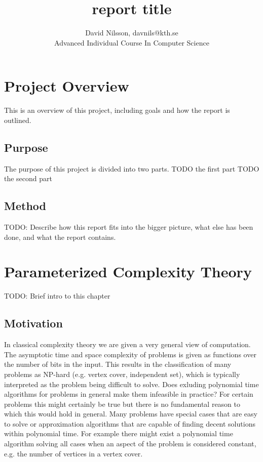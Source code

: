 \documentclass[a4paper,11pt,notitlepage]{report}
\title{report title}
\author{David Nilsson, davnils@kth.se \\ Advanced Individual Course In Computer
Science}
\theoremstyle{plain}
\theoremstyle{definition}
\begin{document}
\maketitle
\clearpage


\tableofcontents

\chapter{Project Overview}
This is an overview of this project, including goals and how the report is outlined.

\section{Purpose}
The purpose of this project is divided into two parts.
TODO the first part
TODO the second part

\section{Method}
TODO: Describe how this report fits into the bigger picture, what else has been
done, and what the report contains.

\chapter{Parameterized Complexity Theory}
TODO: Brief intro to this chapter

\section{Motivation}
In classical complexity theory we are given a very general view of computation.
The asymptotic time and space complexity of problems is given as functions over the number of bits in the input.
This results in the classification of many problems as NP-hard (e.g. vertex cover, independent set), which is typically interpreted as the problem being difficult to solve.
Does exluding polynomial time algorithms for problems in general make them infeasible in practice?
For certain problems this might certainly be true but there is no fundamental reason to which this would hold in general.
Many problems have special cases that are easy to solve or approximation algorithms that are capable of finding decent solutions within polynomial time.
For example there might exist a polynomial time algorithm solving all cases when an aspect of the problem is considered constant, e.g. the number of vertices in a vertex cover.
\end{document}
